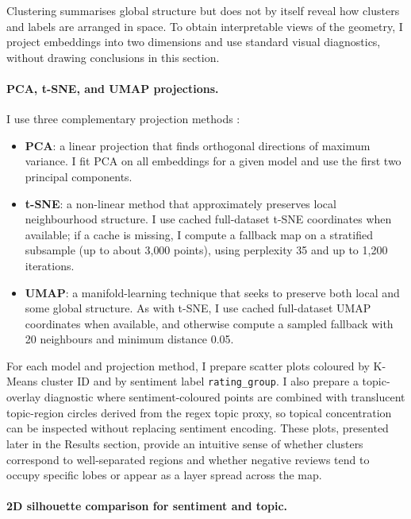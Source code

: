 \documentclass[a4paper,11pt]{article}
\begin{document}
Clustering summarises global structure but does not by itself reveal how clusters and labels are arranged in space. 
To obtain interpretable views of the geometry, I project embeddings into two dimensions and use standard visual diagnostics, without drawing conclusions in this section.

\paragraph{PCA, t-SNE, and UMAP projections.}

I use three complementary projection methods \citep{jolliffe-pca,maaten-hinton-tsne,mcinnes-umap}:

\begin{itemize}
    \item \textbf{PCA}: a linear projection that finds orthogonal directions of maximum variance. I fit PCA on all embeddings for a given model and use the first two principal components.
    \item \textbf{t-SNE}: a non-linear method that approximately preserves local neighbourhood structure. I use cached full-dataset t-SNE coordinates when available; if a cache is missing, I compute a fallback map on a stratified subsample (up to about 3{,}000 points), using perplexity 35 and up to 1{,}200 iterations.
    \item \textbf{UMAP}: a manifold-learning technique that seeks to preserve both local and some global structure. As with t-SNE, I use cached full-dataset UMAP coordinates when available, and otherwise compute a sampled fallback with 20 neighbours and minimum distance 0.05.
\end{itemize}

For each model and projection method, I prepare scatter plots coloured by K-Means cluster ID and by sentiment label \texttt{rating\_group}. 
I also prepare a topic-overlay diagnostic where sentiment-coloured points are combined with translucent topic-region circles derived from the regex topic proxy, so topical concentration can be inspected without replacing sentiment encoding.
These plots, presented later in the Results section, provide an intuitive sense of whether clusters correspond to well-separated regions and whether negative reviews tend to occupy specific lobes or appear as a layer spread across the map.

\paragraph{2D silhouette comparison for sentiment and topic.}
\end{document}
